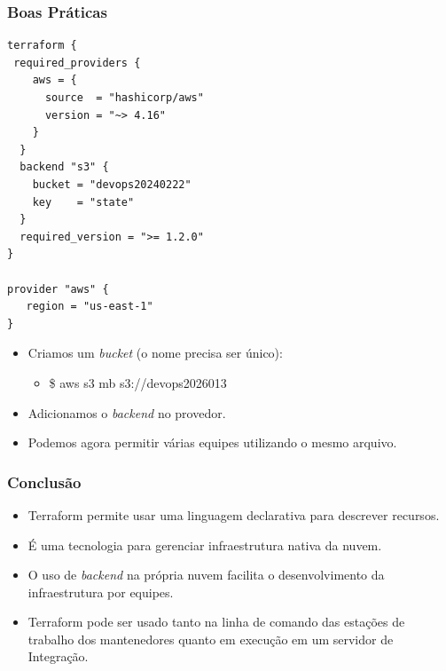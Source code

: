 \documentclass{beamer}
\begin{document}
   \begin{frame}[fragile]
      \frametitle{Boas Práticas}
      \footnotesize 
      \begin{verbatim}
terraform {
 required_providers {
    aws = {
      source  = "hashicorp/aws"
      version = "~> 4.16"
    }
  }
  backend "s3" {
    bucket = "devops20240222"
    key    = "state"
  }
  required_version = ">= 1.2.0"
}

provider "aws" {
   region = "us-east-1"
}
      \end{verbatim}
      \begin{itemize}
      \item Criamos um \textit{bucket}\textit{ }(o nome precisa ser único):
      \begin{itemize}
      \item \$ aws s3 mb s3://devops2026013
      \end{itemize}
      \item Adicionamos o \textit{backend}\textit{ }no provedor.
      \item Podemos agora permitir várias equipes utilizando o mesmo arquivo. 
      \end{itemize}
   \end{frame}

   \begin{frame}
      \frametitle{Conclusão}
      \begin{itemize}
      \item Terraform permite usar uma linguagem declarativa para descrever recursos.
      \item É uma tecnologia para gerenciar infraestrutura nativa da nuvem.
      \item O uso de \textit{backend} na própria nuvem facilita o desenvolvimento da infraestrutura por equipes.
      \item Terraform pode ser usado tanto na linha de comando das estações de trabalho dos mantenedores quanto em execução em um servidor de Integração.
      \end{itemize}
   \end{frame}
\end{document}
